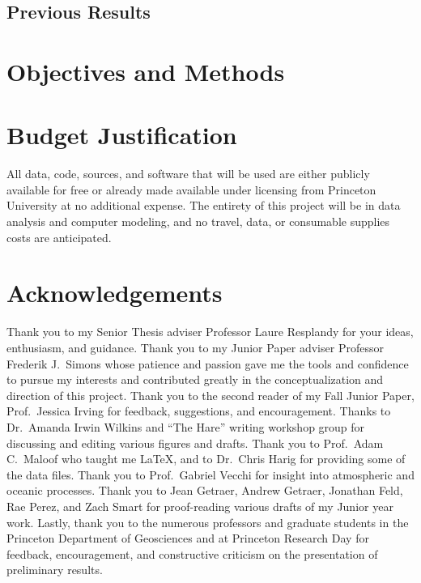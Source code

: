 \documentclass[12pt]{article}
\begin{document}
\subsection{Previous Results \label{sec:prevresults}}

\section{Objectives and Methods \label{sec:methods}} 

\section{Budget Justification \label{sec:budget}}

All data, code, sources, and software that will be used are either
publicly available for free or already made available under licensing
from Princeton University at no additional expense. The entirety of
this project will be in data analysis and computer modeling, and no
travel, data, or consumable supplies costs are anticipated.
 
\section{Acknowledgements \label{sec:ack}}

Thank you to my Senior Thesis adviser Professor Laure Resplandy for your ideas, enthusiasm, and guidance. Thank you to my Junior Paper adviser Professor Frederik J.~Simons whose patience and passion gave me the tools and confidence to pursue my interests and contributed greatly in the conceptualization and direction of this project. Thank you to the second reader of my Fall Junior Paper, Prof.~Jessica Irving for feedback, suggestions, and encouragement. Thanks to Dr.~Amanda
Irwin Wilkins and ``The Hare'' writing workshop group for discussing
and editing various figures and drafts. Thank you to Prof.~Adam C.~Maloof who taught me \LaTeX, and to Dr.~Chris Harig for providing some of the data files. Thank you to Prof.~Gabriel Vecchi for insight into atmospheric and oceanic processes. Thank you to Jean Getraer, Andrew Getraer, Jonathan Feld, Rae Perez, and Zach Smart for proof-reading various drafts of my Junior year work.  Lastly, thank you to the numerous professors and graduate students in the Princeton Department of Geosciences and at Princeton Research Day for feedback, encouragement, and constructive criticism on the presentation of preliminary results.

\small
\renewcommand{\bibsep}{0em}
\renewcommand{\bibname}{References}


\end{document}
